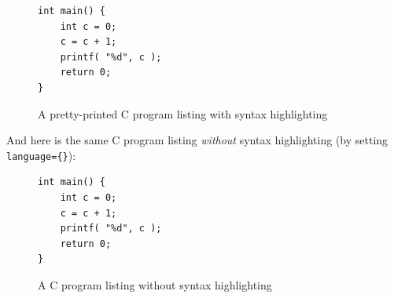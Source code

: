 \begin{figure}[hbt!]
  \lstset{basicstyle=\sffamily, language=C, breaklines=true, columns=fullflexible, framesep=10pt, xleftmargin=.4\textwidth, tabsize=4}
  \begin{lstlisting}
int main() {
	int c = 0;
	c = c + 1;
	printf( "%d", c );
	return 0;
}
\end{lstlisting}
  \caption{A pretty-printed C program listing with syntax highlighting}
\end{figure}


And here is the same C program listing \emph{without} syntax highlighting (by setting \verb|language={}|):

\begin{figure}[hbt!]

  \begin{lstlisting}
int main() {
	int c = 0;
	c = c + 1;
	printf( "%d", c );
	return 0;
}
\end{lstlisting}
  \caption{A C program listing without syntax highlighting}
\end{figure}
